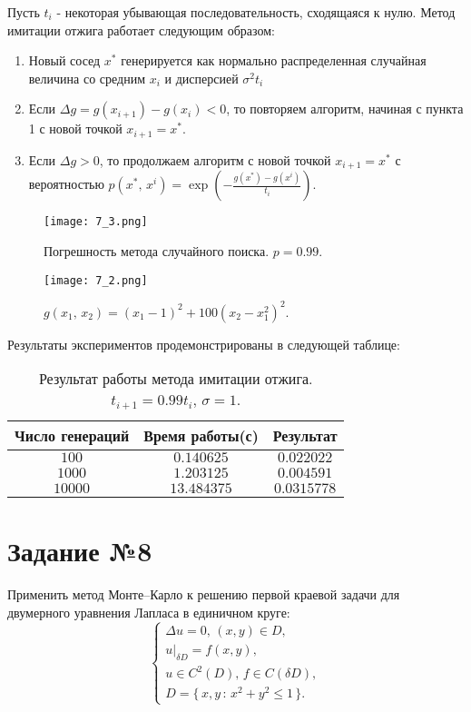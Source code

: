 \documentclass[a4paper, 11pt]{article}
\theoremstyle{def}
\theoremstyle{th}
\theoremstyle{rem}
\begin{document}
Пусть ${t_i}$ - некоторая убывающая последовательность, сходящаяся к нулю. Метод имитации отжига работает следующим образом:
\begin{enumerate}
    \item Новый сосед $x^*$ генерируется как нормально распределенная случайная величина со средним $x_i$ и дисперсией $\sigma^2 t_i$
    \item Если $\Delta g = g(x_{i+1}) - g(x_i) < 0$, то повторяем алгоритм, начиная с пункта 1 с новой точкой $x_{i+1} = x^*$.
    \item Если $\Delta g > 0$, то продолжаем алгоритм с новой точкой $x_{i+1} = x^*$ с вероятностью $p(x^*,\,x^{i}) =\exp\left(-\frac{g(x^*) - g(x^i)}{t_i}\right)$.
\end{enumerate}
\begin{figure}[H]
        \noindent
        \centering
        {
                \texttt{[image: 7\_3.png]}
        }
        \caption{Погрешность метода случайного поиска. $p = 0.99.$}
\end{figure}
\begin{figure}[H]
       \noindent
        \centering
        {
                \texttt{[image: 7\_2.png]}
        }
        \caption{$g(x_1,\,x_2) = (x_1-1)^2+100(x_2-x_1^2)^2$.}
\end{figure}
Результаты экспериментов продемонстрированы в следующей таблице:

\begin{table}[H]
\begin{center}
\begin{tabular}{|c|c|c|}
\hline
Число генераций &
Время работы(с) &
Результат 
\\
\hline
$100$
&
$0.140625$
&
$0.022022$
\\
\hline
$1000$
&
$1.203125$
&
$0.004591$
\\
\hline
$10000$
&
$13.484375$
&
$0.0315778$
\\
\hline
\end{tabular}
\end{center}
\caption{Результат работы метода имитации отжига. $t_{i+1} = 0.99 t_i, \,\sigma = 1$.}
\end{table}



\section{Задание №8}

Применить метод Монте--Карло к решению первой краевой задачи для двумерного уравнения Лапласа в единичном круге:
$$
        \left\{
\begin{array}{lcr}
        \Delta u=0, \, (x,y)\in D,
\\
        u|_{\delta D}=f(x,y),
\\
        u\in C^2(D), \, f \in C(\delta D),
\\
        D = \{\, x,y \,:\, x^2+y^2 \leqslant 1 \,\}.
\end{array}
        \right.
$$
\end{document}
